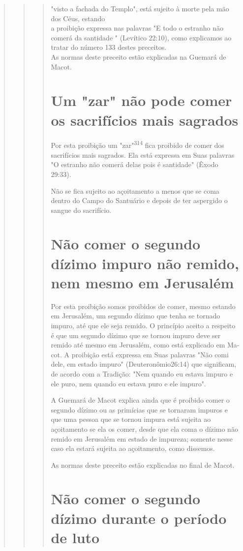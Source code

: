 \begin{quote}
\begin{quote}
\begin{quote}
"visto a fachada do Templo", está sujeito à morte pela mão dos Céus,
estando\\
a proibição expressa nas palavras "E todo o estranho não comerá da
santidade
" (Levítico 22:10), como explicamos ao tratar do número 133 destes
preceitos.\\
As normas deste preceito estão explicadas na Guemará de Macot.

\section{Um "zar" não pode comer os sacrifícios mais sagrados}

Por esta proibição um "zar"\textsuperscript{314} fica proibido de comer
dos sacrifí­cios mais sagrados. Ela está expressa em Suas palavras "O
estranho não comerá delas pois é santidade" (Êxodo 29:33).

Não se fica sujeito ao açoitamento a menos que se coma dentro do Campo
do Santuário e depois de ter aspergido o sangue do sacrifício.

\section{Não comer o segundo dízimo impuro não remido, nem mesmo em Jerusalém}

Por esta proibição somos proibidos de comer, mesmo estando em Jerusalém,
um segundo dízimo que tenha se tornado impuro, até que ele seja remido.
O princípio aceito a respeito é que um segundo dízimo que se tornou
impuro deve ser remido até mesmo em Jerusalém, como está explicado em
Ma-cot. A proibição está expressa em Suas palavras "Não comi dele, em
estado im­puro" (Deuteronômio26:14) que significam, de acordo com a
Tradição: "Nem quando eu estava impuro e ele puro, nem quando eu estava
puro e ele impuro".

A Guemará de Macot explica ainda que é proibido comer o segundo dízimo
ou as primícias que se tornaram impuros e que uma pessoa que se tor­nou
impura está sujeita ao açoitamento se ela os comer, desde que ela coma o
dízimo não remido em Jerusalém em estado de impureza; somente nesse
ca­so ela estará sujeita ao açoitamento, como dissemos.

As normas deste preceito estão explicadas no final de Macot.

\section{Não comer o segundo dízimo durante o período de luto}


\end{quote}
\end{quote}
\end{quote}
